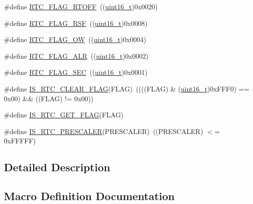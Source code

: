 \begin{DoxyCompactItemize}
\item 
\#define \hyperlink{group___r_t_c__interrupts__flags_ga203dcbb991497e4d0e6722815f6db942}{R\+T\+C\+\_\+\+F\+L\+A\+G\+\_\+\+R\+T\+O\+FF}~((\hyperlink{_p_e___types_8h_a1f1825b69244eb3ad2c7165ddc99c956}{uint16\+\_\+t})0x0020)
\item 
\#define \hyperlink{group___r_t_c__interrupts__flags_ga78c4245996bef8d5f39226b6e37ed9c0}{R\+T\+C\+\_\+\+F\+L\+A\+G\+\_\+\+R\+SF}~((\hyperlink{_p_e___types_8h_a1f1825b69244eb3ad2c7165ddc99c956}{uint16\+\_\+t})0x0008)
\item 
\#define \hyperlink{group___r_t_c__interrupts__flags_ga4e321e359b914d7ed10eed985f8b4811}{R\+T\+C\+\_\+\+F\+L\+A\+G\+\_\+\+OW}~((\hyperlink{_p_e___types_8h_a1f1825b69244eb3ad2c7165ddc99c956}{uint16\+\_\+t})0x0004)
\item 
\#define \hyperlink{group___r_t_c__interrupts__flags_gaed4375a7ea5a147f83c6cf4bfa805caf}{R\+T\+C\+\_\+\+F\+L\+A\+G\+\_\+\+A\+LR}~((\hyperlink{_p_e___types_8h_a1f1825b69244eb3ad2c7165ddc99c956}{uint16\+\_\+t})0x0002)
\item 
\#define \hyperlink{group___r_t_c__interrupts__flags_ga8babb2c823c2097bf4a4ef0c20ef7367}{R\+T\+C\+\_\+\+F\+L\+A\+G\+\_\+\+S\+EC}~((\hyperlink{_p_e___types_8h_a1f1825b69244eb3ad2c7165ddc99c956}{uint16\+\_\+t})0x0001)
\item 
\#define \hyperlink{group___r_t_c__interrupts__flags_ga5f8a9327a258f16f29703fa3e3cc8af7}{I\+S\+\_\+\+R\+T\+C\+\_\+\+C\+L\+E\+A\+R\+\_\+\+F\+L\+AG}(F\+L\+AG)~((((F\+L\+AG) \& (\hyperlink{_p_e___types_8h_a1f1825b69244eb3ad2c7165ddc99c956}{uint16\+\_\+t})0x\+F\+F\+F0) == 0x00) \&\& ((\+F\+L\+A\+G) != 0x00))
\item 
\#define \hyperlink{group___r_t_c__interrupts__flags_ga2126725a0d48f1c40f42566e249620ef}{I\+S\+\_\+\+R\+T\+C\+\_\+\+G\+E\+T\+\_\+\+F\+L\+AG}(F\+L\+AG)
\item 
\#define \hyperlink{group___r_t_c__interrupts__flags_ga483b9ec67246cbfb2874c5a85f0cb4d8}{I\+S\+\_\+\+R\+T\+C\+\_\+\+P\+R\+E\+S\+C\+A\+L\+ER}(P\+R\+E\+S\+C\+A\+L\+ER)~((P\+R\+E\+S\+C\+A\+L\+ER) $<$= 0x\+F\+F\+F\+F\+F)
\end{DoxyCompactItemize}


\subsection{Detailed Description}


\subsection{Macro Definition Documentation}
